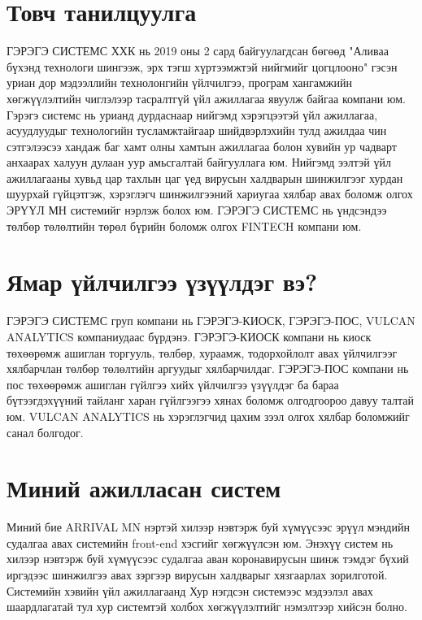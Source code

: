 \section{Товч танилцуулга}
ГЭРЭГЭ СИСТЕМС ХХК нь 2019 оны 2 сард байгуулагдсан бөгөөд "Аливаа бүхэнд технологи шингээж, эрх тэгш хүртээмжтэй нийгмийг цогцлооно" гэсэн уриан дор мэдээллийн технолонгийн үйлчилгээ, програм хангамжийн хөгжүүлэлтийн чиглэлээр тасралтгүй үйл ажиллагаа явуулж байгаа компани юм. Гэрэгэ системс нь урианд дурдаснаар нийгэмд хэрэгцээтэй үйл ажиллагаа, асуудлуудыг технологийн тусламжтайгаар шийдвэрлэхийн тулд ажилдаа чин сэтгэлээсээ хандаж баг хамт олны хамтын ажиллагаа болон хувийн ур чадварт анхаарах халуун дулаан уур амьсгалтай байгууллага юм. Нийгэмд ээлтэй үйл ажиллагааны хувьд цар тахлын цаг үед вирусын халдварын шинжилгээг хурдан шуурхай гүйцэтгэж, хэрэглэгч шинжилгээний хариугаа хялбар авах боломж олгох ЭРҮҮЛ МН системийг нэрлэж болох юм. ГЭРЭГЭ СИСТЕМС нь үндсэндээ төлбөр төлөлтийн төрөл бүрийн боломж олгох FINTECH компани юм. 

\section{Ямар үйлчилгээ үзүүлдэг вэ?}
ГЭРЭГЭ СИСТЕМС груп компани нь ГЭРЭГЭ-КИОСК, ГЭРЭГЭ-ПОС, VULCAN ANALYTICS компаниудаас бүрдэнэ. ГЭРЭГЭ-КИОСК компани нь киоск төхөөрөмж ашиглан торгууль, төлбөр, хураамж, тодорхойлолт авах үйлчилгээг хялбарчлан төлбөр төлөлтийн аргуудыг хялбарчилдаг. ГЭРЭГЭ-ПОС компани нь пос төхөөрөмж ашиглан гүйлгээ хийх үйлчилгээ үзүүлдэг ба бараа бүтээгдэхүүний тайланг харан гүйлгээгээ хянах боломж олгодгоороо давуу талтай юм. VULCAN ANALYTICS нь хэрэглэгчид цахим зээл олгох хялбар боломжийг санал болгодог. 

\section{Миний ажилласан систем}
Миний бие ARRIVAL MN нэртэй хилээр нэвтэрж буй хүмүүсээс эрүүл мэндийн судалгаа авах системийн front-end хэсгийг хөгжүүлсэн юм. Энэхүү систем нь хилээр нэвтэрж буй хүмүүсээс судалгаа аван коронавирусын шинж тэмдэг бүхий иргэдээс шинжилгээ авах зэргээр вирусын халдварыг хязгаарлах зорилготой. Системийн хэвийн үйл ажиллагаанд Хур нэгдсэн системээс мэдээлэл авах шаардлагатай тул хур системтэй холбох хөгжүүлэлтийг нэмэлтээр хийсэн болно. 

